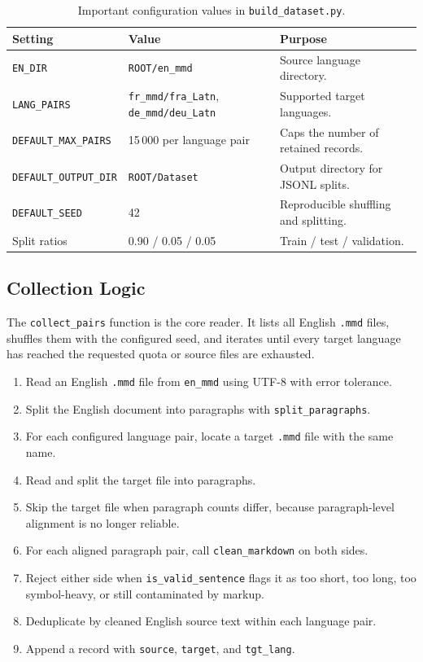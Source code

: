 \documentclass[12pt,a4paper]{article}
\begin{document}
\begin{table}[H]
\centering
\caption{Important configuration values in \texttt{build\_dataset.py}.}
\label{tab:build-config}
\renewcommand{\arraystretch}{1.25}
\begin{tabularx}{\linewidth}{llX}
\toprule
\textbf{Setting} & \textbf{Value} & \textbf{Purpose} \\
\midrule
\texttt{EN\_DIR}             & \texttt{ROOT/en\_mmd}          & Source language directory. \\
\texttt{LANG\_PAIRS}         & \texttt{fr\_mmd/fra\_Latn}, \texttt{de\_mmd/deu\_Latn} & Supported target languages. \\
\texttt{DEFAULT\_MAX\_PAIRS} & 15\,000 per language pair      & Caps the number of retained records. \\
\texttt{DEFAULT\_OUTPUT\_DIR}& \texttt{ROOT/Dataset}          & Output directory for JSONL splits. \\
\texttt{DEFAULT\_SEED}       & 42                             & Reproducible shuffling and splitting. \\
Split ratios                 & 0.90 / 0.05 / 0.05             & Train / test / validation. \\
\bottomrule
\end{tabularx}
\end{table}

\subsection{Collection Logic}

The \texttt{collect\_pairs} function is the core reader. It lists all English \texttt{.mmd} files, shuffles them with the configured seed, and iterates until every target language has reached the requested quota or source files are exhausted.

\begin{enumerate}
  \item Read an English \texttt{.mmd} file from \texttt{en\_mmd} using UTF-8 with error tolerance.
  \item Split the English document into paragraphs with \texttt{split\_paragraphs}.
  \item For each configured language pair, locate a target \texttt{.mmd} file with the same name.
  \item Read and split the target file into paragraphs.
  \item Skip the target file when paragraph counts differ, because paragraph-level alignment is no longer reliable.
  \item For each aligned paragraph pair, call \texttt{clean\_markdown} on both sides.
  \item Reject either side when \texttt{is\_valid\_sentence} flags it as too short, too long, too symbol-heavy, or still contaminated by markup.
  \item Deduplicate by cleaned English source text within each language pair.
  \item Append a record with \texttt{source}, \texttt{target}, and \texttt{tgt\_lang}.
\end{enumerate}
\end{document}
